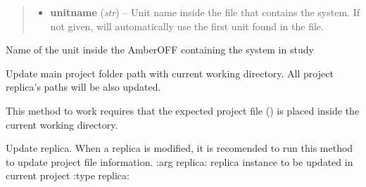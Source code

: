 \documentclass[letterpaper,10pt,english]{sphinxmanual}
\begin{document}
\begin{fulllineitems}
\begin{fulllineitems}
\begin{quote}
\begin{description}
\begin{itemize}
\item {} 
\textbf{unitname} (\emph{str}) -- Unit name inside the file that contains the system. If not given, will automatically use the first unit found in the file.

\end{itemize}

\end{description}\end{quote}

\end{fulllineitems}


\begin{fulllineitems}
\label{project:pyMDMix.Project.Project.unitName}
Name of the unit inside the AmberOFF containing the system in study

\end{fulllineitems}


\begin{fulllineitems}
\label{project:pyMDMix.Project.Project.updatePath}
Update main project folder path with current working directory.
All project replica's paths will be also updated.

This method to work requires that the expected project file ({\hyperref[project:pyMDMix.Project.Project.projFileName]{}}) is placed inside the current working directory.

\end{fulllineitems}


\begin{fulllineitems}
\label{project:pyMDMix.Project.Project.updateReplica}
Update replica. When a replica is modified, it is recomended to run this method to update project file information.
:arg replica: replica instance to be updated in current project
:type replica: {\hyperref[replicas:pyMDMix.Replicas.Replica]{}}

\end{fulllineitems}



\end{fulllineitems}
\end{document}

